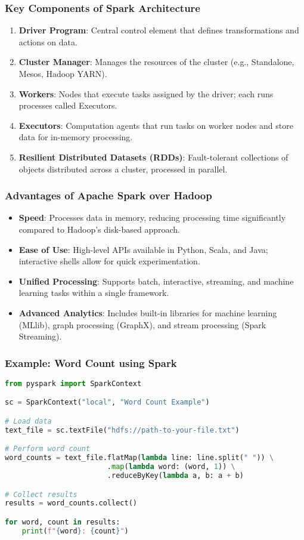 \documentclass[aspectratio=169]{beamer}
\begin{document}
\begin{frame}[fragile]
    \frametitle{Key Components of Spark Architecture}
    \begin{enumerate}
        \item \textbf{Driver Program}: Central control element that defines transformations and actions on data.
        \item \textbf{Cluster Manager}: Manages the resources of the cluster (e.g., Standalone, Mesos, Hadoop YARN).
        \item \textbf{Workers}: Nodes that execute tasks assigned by the driver; each runs processes called Executors.
        \item \textbf{Executors}: Computation agents that run tasks on worker nodes and store data for in-memory processing.
        \item \textbf{Resilient Distributed Datasets (RDDs)}: Fault-tolerant collections of objects distributed across a cluster, processed in parallel.
    \end{enumerate}
\end{frame}

\begin{frame}[fragile]
    \frametitle{Advantages of Apache Spark over Hadoop}
    \begin{itemize}
        \item \textbf{Speed}: Processes data in memory, reducing processing time significantly compared to Hadoop's disk-based approach.
        \item \textbf{Ease of Use}: High-level APIs available in Python, Scala, and Java; interactive shells allow for quick experimentation.
        \item \textbf{Unified Processing}: Supports batch, interactive, streaming, and machine learning tasks within a single framework.
        \item \textbf{Advanced Analytics}: Includes built-in libraries for machine learning (MLlib), graph processing (GraphX), and stream processing (Spark Streaming).
    \end{itemize}
\end{frame}

\begin{frame}[fragile]
    \frametitle{Example: Word Count using Spark}
    \begin{lstlisting}[language=Python]
from pyspark import SparkContext

sc = SparkContext("local", "Word Count Example")

# Load data
text_file = sc.textFile("hdfs://path-to-your-file.txt")

# Perform word count
word_counts = text_file.flatMap(lambda line: line.split(" ")) \
                        .map(lambda word: (word, 1)) \
                        .reduceByKey(lambda a, b: a + b)

# Collect results
results = word_counts.collect()

for word, count in results:
    print(f"{word}: {count}")
    \end{lstlisting}
\end{frame}
\end{document}
